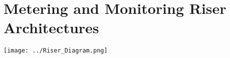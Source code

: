 \section{Metering and Monitoring Riser Architectures}

\begin{center}
	\centering
	\texttt{[image: ../Riser\_Diagram.png]}

\end{center}